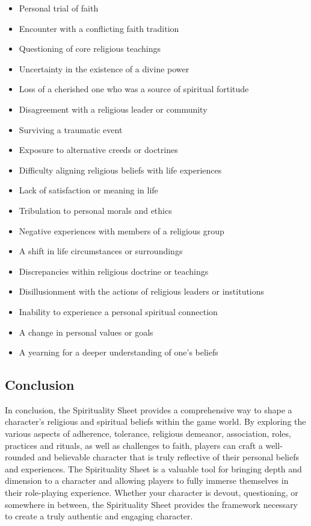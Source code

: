 \documentclass[12pt]{book}  %
\begin{document}
\begin{itemize}
    \item Personal trial of faith
    \item Encounter with a conflicting faith tradition
    \item Questioning of core religious teachings
    \item Uncertainty in the existence of a divine power
    \item Loss of a cherished one who was a source of spiritual fortitude
    \item Disagreement with a religious leader or community
    \item Surviving a traumatic event
    \item Exposure to alternative creeds or doctrines
    \item Difficulty aligning religious beliefs with life experiences
    \item Lack of satisfaction or meaning in life
    \item Tribulation to personal morals and ethics
    \item Negative experiences with members of a religious group
    \item A shift in life circumstances or surroundings
    \item Discrepancies within religious doctrine or teachings
    \item Disillusionment with the actions of religious leaders or institutions
    \item Inability to experience a personal spiritual connection
    \item A change in personal values or goals
    \item A yearning for a deeper understanding of one's beliefs
\end{itemize}

\subsection{\textbf{Conclusion}}

In conclusion, the Spirituality Sheet provides a comprehensive way to shape a character's religious and spiritual beliefs within the game world. By exploring the various aspects of adherence, tolerance, religious demeanor, association, roles, practices and rituals, as well as challenges to faith, players can craft a well-rounded and believable character that is truly reflective of their personal beliefs and experiences. The Spirituality Sheet is a valuable tool for bringing depth and dimension to a character and allowing players to fully immerse themselves in their role-playing experience. Whether your character is devout, questioning, or somewhere in between, the Spirituality Sheet provides the framework necessary to create a truly authentic and engaging character.
\end{document}
